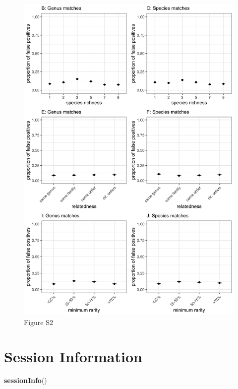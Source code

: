 \documentclass[
]{article}
\newenvironment{Shaded}{\begin{snugshade}}{\end{snugshade}}
\newcommand{\KeywordTok}[1]{\textcolor[rgb]{0.13,0.29,0.53}{\textbf{#1}}}
\newcommand{\NormalTok}[1]{#1}
\begin{document}
\begin{figure}
\centering
\includegraphics{figS2_combined.jpg}
\caption{Figure S2}
\end{figure}

\hypertarget{session-information}{%
\section{Session Information}\label{session-information}}

\begin{Shaded}
\begin{Highlighting}[]
\KeywordTok{sessionInfo}\NormalTok{()}
\end{Highlighting}
\end{Shaded}
\end{document}
